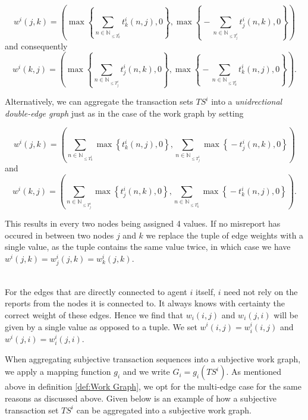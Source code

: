 \[
w^i(j,k)=\left( \max\left\lbrace{}\sum\limits_{n\in\mathbb{N}_{\leq{}T_k^i}}t_k^i(n,j), 0\right\rbrace, \max\left\lbrace{}-\sum\limits_{n\in\mathbb{N}_{\leq{}T_j^i}}t_j^i(n,k), 0\right\rbrace \right)
\]
\noindent{}and consequently
\[
w^i(k,j) = \left(\max\left\lbrace{}\sum\limits_{n\in\mathbb{N}_{\leq{}T_j^i}}t_j^i(n,k), 0\right\rbrace, \max\left\lbrace{}-\sum\limits_{n\in\mathbb{N}_{\leq{}T_k^i}}t_k^i(n,j), 0\right\rbrace\right).
\]

\noindent{}Alternatively, we can aggregate the transaction sets $TS^i$ into a {\it unidrectional double-edge graph} just as in the case of the work graph by setting

\[
w^i(j,k) = \left(\sum\limits_{n\in\mathbb{N}_{\leq{}T_k^i}}\max\left\lbrace{}t_k^i(n,j), 0 \right\rbrace , \sum\limits_{n\in\mathbb{N}_{\leq{}T_j^i}}\max\left\lbrace{}-t_j^i(n,k),0\right\rbrace\right) 
\]
\noindent{}and
\[
w^i(k,j) = \left(\sum\limits_{n\in\mathbb{N}_{\leq{}T_j^i}}\max\left\lbrace{}t_j^i(n,k), 0 \right\rbrace , \sum\limits_{n\in\mathbb{N}_{\leq{}T_k^i}}\max\left\lbrace{}-t_k^i(n,j),0\right\rbrace\right).
\]

\noindent{}This results in every two nodes being assigned 4 values. If no misreport has occured in between two nodes $j$ and $k$ we replace the tuple of edge weights with a single value, as the tuple contains the same value twice, in which case we have $w^i(j,k)=w^i_j(j,k)=w^i_k(j,k)$. \vspace{1em}\\

\begin{remark}[]\ \\
\label{rem:Edge Weights connected to i}
\noindent{}For the edges that are directly connected to agent $i$ itself, $i$ need not rely on the reports from the nodes it is connected to. It always knows with certainty the correct weight of these edges. Hence we find that $w_i(i,j)$ and $w_i(j,i)$ will be given by a single value as opposed to a tuple. We set $w^i(i,j)=w^i_i(i,j)$ and $w^i(j,i)=w_i^i(j,i)$. \vspace{1em}\\
\end{remark}

\noindent{}When aggregating subjective transaction sequences into a subjective work graph, we apply a mapping function $g_i$ and we write $G_i=g_i(TS^i)$. As mentioned above in definition \ref{def:Work Graph}, we opt for the multi-edge case for the same reasons as discussed above. Given below is an example of how a subjective transaction set $TS^i$ can be aggregated into a subjective work graph. \vspace{1em}\\

